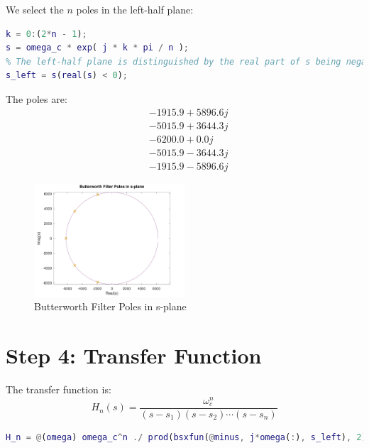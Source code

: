 \documentclass[12pt]{article}
\begin{document}
We select the $n$ poles in the left-half plane:
\begin{lstlisting}[language=Matlab, caption={Poles Calculation}]
k = 0:(2*n - 1);
s = omega_c * exp( j * k * pi / n );
% The left-half plane is distinguished by the real part of s being negative
s_left = s(real(s) < 0);
\end{lstlisting}
The poles are:
\begin{align*}
&-1915.9 + 5896.6j \\
&-5015.9 + 3644.3j \\
&-6200.0 + 0.0j \\
&-5015.9 - 3644.3j \\
&-1915.9 - 5896.6j
\end{align*}
\begin{figure}[H]
    \centering
    \includegraphics[width=0.5\textwidth]{filter_poles.png}
    \caption{Butterworth Filter Poles in s-plane}
\end{figure}

\section*{Step 4: Transfer Function}
The transfer function is:
\begin{equation*}
H_n(s) = \frac{\omega_c^n}{(s - s_1)(s - s_2)\cdots(s - s_n)}
\end{equation*}

\begin{lstlisting}[language=Matlab, caption={Transfer Function}]
H_n = @(omega) omega_c^n ./ prod(bsxfun(@minus, j*omega(:), s_left), 2);
\end{lstlisting}
\end{document}
